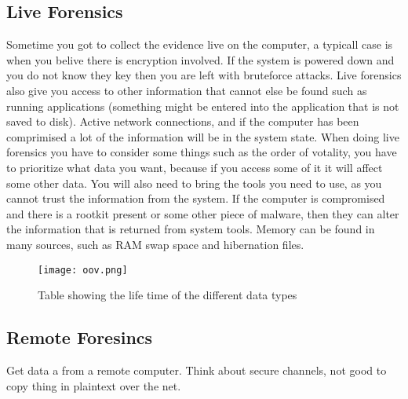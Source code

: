 \subsection{Live Forensics}
Sometime you got to collect the evidence live on the computer, a typicall 
case is when you belive there is encryption involved. If the system is powered
down and you do not know they key then you are left with bruteforce attacks. 
Live forensics also give you access to other information that cannot else be
found such as running applications (something might be entered into the 
application that is not saved to disk). Active network connections, and if the
computer has been comprimised a lot of the information will be in the system
state. When doing live forensics you have to consider some things such as the
order of votality, you have to prioritize what data you want, because if you
access some of it it will affect some other data. You will also need to bring
the tools you need to use, as you cannot trust the information from the system.
If the computer is compromised and there is a rootkit present or some other 
piece of malware, then they can alter the information that is returned from
system tools. Memory can be found in many sources, such as RAM swap space and
hibernation files.

\begin{figure}[h]                                                                                                                 
    \centering\texttt{[image: oov.png]}
    \caption{Table showing the life time of the different data types}
\end{figure}

\subsection{Remote Foresincs}
    Get data a from a remote computer.
    Think about secure channels, not good to copy thing in plaintext
    over the net.


